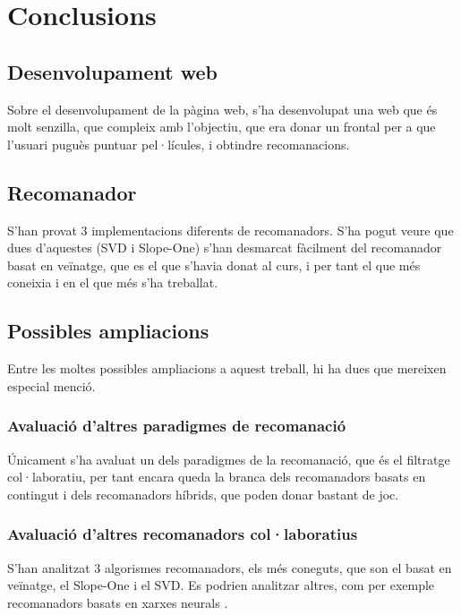 \chapter{Conclusions}

\section{Desenvolupament web}

Sobre el desenvolupament de la pàgina web, s'ha desenvolupat una web que és molt senzilla, que compleix amb l'objectiu, que era donar un frontal per a que l'usuari puguès puntuar pel·lícules, i obtindre recomanacions.

\section{Recomanador}

S'han provat 3 implementacions diferents de recomanadors. S'ha pogut veure que dues d'aquestes (SVD i Slope-One) s'han desmarcat fàcilment del recomanador basat en veïnatge, que es el que s'havia donat al curs, i per tant el que més coneixia i en el que més s'ha treballat.

\section{Possibles ampliacions}

Entre les moltes possibles ampliacions a aquest treball, hi ha dues que mereixen especial menció.

\subsection{Avaluació d'altres paradigmes de recomanació}

Únicament s'ha avaluat un dels paradigmes de la recomanació, que és el filtratge col·laboratiu, per tant encara queda la branca dels recomanadors basats en contingut i dels recomanadors híbrids, que poden donar bastant de joc.

\subsection{Avaluació d'altres recomanadors col·laboratius}

S'han analitzat 3 algorismes recomanadors, els més coneguts, que son el basat en veïnatge, el Slope-One i el SVD. Es podrien analitzar altres, com per exemple recomanadors basats en xarxes neurals \cite{introduction-rbm, collaborative-filtering-som-cbr, rmb-collaborative-filtering}.